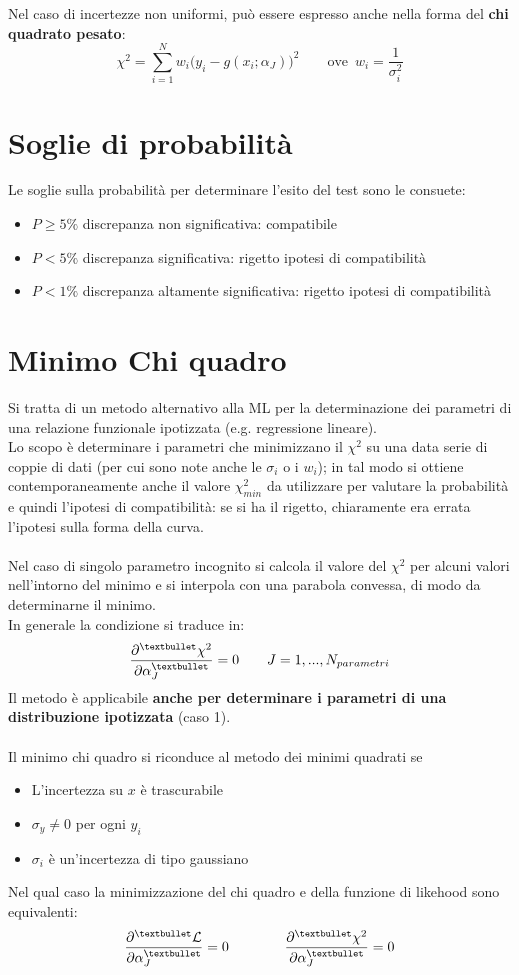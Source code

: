 \documentclass[10pt, oneside]{book}
\begin{document}
Nel caso di incertezze non uniformi, può essere espresso anche nella forma del \textbf{chi quadrato pesato}:
\[\chi^2 = \sum\limits_{i=1}^{N} w_i \big(y_i - g(x_i; \alpha_J)\big)^2 \qquad \textrm{ove } \, w_i = \frac{1}{\sigma_i^2}\]

\section{Soglie di probabilità}
Le soglie sulla probabilità per determinare l'esito del test sono le consuete:
\begin{itemize}
\item $P \geq 5\%$ discrepanza non significativa: compatibile
\item $P < 5\%$ discrepanza significativa: rigetto ipotesi di compatibilità
\item $P < 1\%$ discrepanza altamente significativa: rigetto ipotesi di compatibilità
\end{itemize}

\section{Minimo Chi quadro}
Si tratta di un metodo alternativo alla ML per la determinazione dei parametri di una relazione funzionale ipotizzata (e.g. regressione lineare).\\
Lo scopo è determinare i parametri che minimizzano il $\chi^2$ su una data serie di coppie di dati (per cui sono note anche le $\sigma_i$ o i $w_i$); in tal modo si ottiene contemporaneamente anche il valore $\chi^2_{min}$ da utilizzare per valutare la probabilità e quindi l'ipotesi di compatibilità: se si ha il rigetto, chiaramente era errata l'ipotesi sulla forma della curva.\\~\\
Nel caso di singolo parametro incognito si calcola il valore del $\chi^2$ per alcuni valori nell'intorno del minimo e si interpola con una parabola convessa, di modo da determinarne il minimo.\\
In generale la condizione si traduce in:
\[\pdv[•]{\chi^2}{\alpha_J} = 0 \qquad J = 1, ..., N_{parametri}\]
Il metodo è applicabile \textbf{anche per determinare i parametri di una distribuzione ipotizzata} (caso 1).\\~\\
Il minimo chi quadro si riconduce al metodo dei minimi quadrati se
\begin{itemize}
\item L'incertezza su $x$ è trascurabile
\item $\sigma_y \neq 0$ per ogni $y_i$
\item $\sigma_i$ è un'incertezza di tipo gaussiano
\end{itemize}
Nel qual caso la minimizzazione del chi quadro e della funzione di likehood sono equivalenti:
\[\pdv[•]{\mathcal{L}}{\alpha_J} = 0 \qquad \qquad \pdv[•]{\chi^2}{\alpha_J} = 0\]
\end{document}
